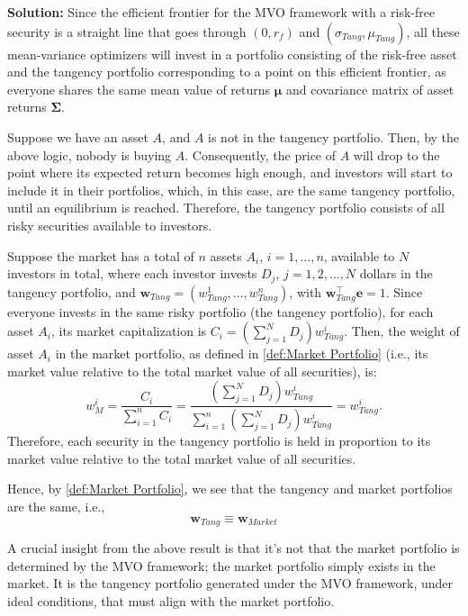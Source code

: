 \documentclass[13pt]{article}
\theoremstyle{definition}
\newenvironment{solution}
{\color{C2}\begin{framed}\begingroup\textbf{Solution:} }
  {\endgroup\end{framed}}
\theoremstyle{remark}
\newenvironment{remark}
  {\pushQED{\qed}\renewcommand{\qedsymbol}{$\triangle$}\remarkx}
  {\popQED\endremarkx}
\begin{document}
\begin{solution}
    Since the efficient frontier for the MVO framework with a risk-free security is a straight line that goes through $(0,r_f)$ and $(\sigma_{Tang}, \mu_{Tang})$, all these mean-variance optimizers will invest in a portfolio consisting of the risk-free asset and the tangency portfolio corresponding to a point on this efficient frontier, as everyone shares the same mean value of returns $\bm{\mu}$ and covariance matrix of asset returns $\mathbf{\Sigma}$.

Suppose we have an asset $A$, and $A$ is not in the tangency portfolio. Then, by the above logic, nobody is buying $A$. Consequently, the price of $A$ will drop to the point where its expected return becomes high enough, and investors will start to include it in their portfolios, which, in this case, are the same tangency portfolio, until an equilibrium is reached. Therefore, the tangency portfolio consists of all risky securities available to investors.

Suppose the market has a total of $n$ assets $A_i$, $i=1,\ldots, n$, available to $N$ investors in total, where each investor invests $D_j$, $j=1,2,\ldots, N$ dollars in the tangency portfolio, and $\bm{w}_{Tang}=(w_{Tang}^1, \ldots, w_{Tang}^n)$, with $\bm{w}_{Tang}^\top \bm{e}=1$. Since everyone invests in the same risky portfolio (the tangency portfolio), for each asset $A_i$, its market capitalization is $C_i=\left(\sum_{j=1}^N D_j\right)w_{Tang}^i$. Then, the weight of asset $A_i$ in the market portfolio, as defined in \cref{def:Market Portfolio} (i.e., its market value relative to the total market value of all securities), is:
\[
w_M^i=\frac{C_i}{\sum_{i=1}^n C_i} =\frac{\left(\sum_{j=1}^N D_j\right)w_{Tang}^i}{\sum_{i=1}^n\left(\sum_{j=1}^N D_j\right)w_{Tang}^i} = w_{Tang}^i.
\] 
    Therefore, each security in the tangency portfolio is held in proportion to its market value relative to the total market value of all securities.

    Hence, by \cref{def:Market Portfolio}, we see that the tangency and market portfolios are the same, i.e.,
$$
\bm{w}_{Tang } \equiv \bm{w}_{Market}
$$

\end{solution}
\begin{remark}A crucial insight from the above result is that it's not that the market portfolio is determined by the MVO framework; the market portfolio simply exists in the market. It is the tangency portfolio generated under the MVO framework, under ideal conditions, that must align with the market portfolio.
\end{remark}
\end{document}
